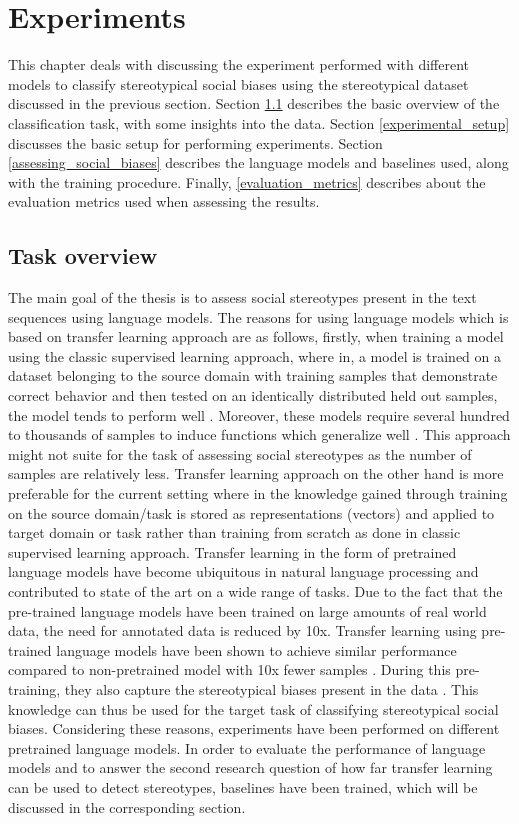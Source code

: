 \chapter{Experiments}

This chapter deals with discussing the experiment performed with different models to classify stereotypical social biases using the stereotypical dataset discussed in the previous section. Section \ref{task_overview} describes the basic overview of the classification task, with some insights into the data. Section \ref{experimental_setup}  discusses the basic setup for performing experiments. Section \ref{assessing_social_biases} describes the language models and baselines used, along with the training procedure. Finally, \ref{evaluation_metrics} describes about the evaluation metrics used when assessing the results.

\section{ Task overview}\label{task_overview}
The main goal of the thesis is to assess social stereotypes present in the text sequences using language models. The reasons for using language models which is based on transfer learning approach are as follows, firstly, when training a model using the classic supervised learning approach, where in, a model is trained on a dataset belonging to the source domain with training samples that demonstrate correct behavior and then tested on an identically distributed held out samples, the model tends to perform well \cite{ruder2019neural}. Moreover, these models require several hundred to thousands of samples to induce functions which generalize well \cite{radford2019language}. This approach might not suite for the task of assessing social stereotypes as the number of samples are relatively less. Transfer learning approach on the other hand is more preferable for the current setting where in the knowledge gained through training on the source domain/task is stored as representations (vectors) and applied to target domain or task \cite{ruder2019neural} rather than training from scratch as done in classic supervised learning approach. Transfer learning in the form of pretrained language models have become ubiquitous in natural language processing and contributed to state of the art on a wide range of tasks\cite{ruder2019transfer}. Due to the fact that the pre-trained language models have been trained on large amounts of real world data, the need for annotated data is reduced by 10x. Transfer learning using pre-trained language models have been shown to achieve similar performance compared to non-pretrained model with 10x fewer samples \cite{howard2018universal}. During this pre-training, they also capture the stereotypical biases present in the data \cite{nadeem2020stereoset}. This knowledge can thus be used for the target task of classifying stereotypical social biases. Considering these reasons, experiments have been performed on different pretrained language models. In order to evaluate the performance of language models and to answer the second research question of how far transfer learning can be used to detect stereotypes, baselines have been trained, which will be discussed in the corresponding section.

